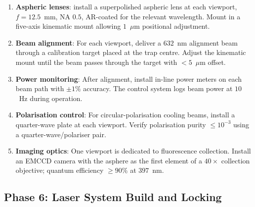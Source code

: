 \begin{enumerate}[leftmargin=1.5em]
    \item \textbf{Aspheric lenses}: install a superpolished aspheric lens at each viewport, $f = 12.5$~mm, NA $0.5$, AR-coated for the relevant wavelength. Mount in a five-axis kinematic mount allowing $1$~$\mu$m positional adjustment.
    \item \textbf{Beam alignment}: For each viewport, deliver a $632$~nm alignment beam through a calibration target placed at the trap centre. Adjust the kinematic mount until the beam passes through the target with $< 5$~$\mu$m offset.
    \item \textbf{Power monitoring}: After alignment, install in-line power meters on each beam path with $\pm 1\%$ accuracy. The control system logs beam power at $10$~Hz during operation.
    \item \textbf{Polarisation control}: For circular-polarisation cooling beams, install a quarter-wave plate at each viewport. Verify polarisation purity $\le 10^{-3}$ using a quarter-wave/polariser pair.
    \item \textbf{Imaging optics}: One viewport is dedicated to fluorescence collection. Install an EMCCD camera with the asphere as the first element of a $40\times$ collection objective; quantum efficiency $\ge 90$\% at $397$~nm.
\end{enumerate}

\subsection{Phase 6: Laser System Build and Locking}
\label{subsec:phase6_lasers}

